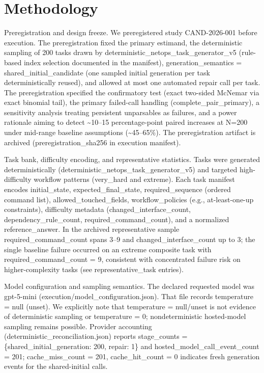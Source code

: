 \documentclass[conference]{IEEEtran}
\begin{document}
\section{Methodology}
Preregistration and design freeze. We preregistered study CAND-2026-001 before execution. The preregistration fixed the primary estimand, the deterministic sampling of 200 tasks drawn by deterministic\_netops\_task\_generator\_v5 (rule-based index selection documented in the manifest), generation\_semantics = shared\_initial\_candidate (one sampled initial generation per task deterministically reused), and allowed at most one automated repair call per task. The preregistration specified the confirmatory test (exact two-sided McNemar via exact binomial tail), the primary failed-call handling (complete\_pair\_primary), a sensitivity analysis treating persistent unparsables as failures, and a power rationale aiming to detect \textasciitilde{}10--15 percentage-point paired increases at N=200 under mid-range baseline assumptions (\textasciitilde{}45--65\%). The preregistration artifact is archived (preregistration\_sha256 in execution manifest).

Task bank, difficulty encoding, and representative statistics. Tasks were generated deterministically (deterministic\_netops\_task\_generator\_v5) and targeted high-difficulty workflow patterns (very\_hard and extreme). Each task manifest encodes initial\_state, expected\_final\_state, required\_sequence (ordered command list), allowed\_touched\_fields, workflow\_policies (e.g., at-least-one-up constraints), difficulty metadata (changed\_interface\_count, dependency\_rule\_count, required\_command\_count), and a normalized reference\_answer. In the archived representative sample required\_command\_count spans 3--9 and changed\_interface\_count up to 3; the single baseline failure occurred on an extreme composite task with required\_command\_count = 9, consistent with concentrated failure risk on higher-complexity tasks (see representative\_task entries).

Model configuration and sampling semantics. The declared requested model was gpt-5-mini (execution/model\_configuration.json). That file records temperature = null (unset). We explicitly note that temperature = null/unset is not evidence of deterministic sampling or temperature = 0; nondeterministic hosted-model sampling remains possible. Provider accounting (deterministic\_reconciliation.json) reports stage\_counts = \{shared\_initial\_generation: 200, repair: 1\} and hosted\_model\_call\_event\_count = 201; cache\_miss\_count = 201, cache\_hit\_count = 0 indicates fresh generation events for the shared-initial calls.
\end{document}
